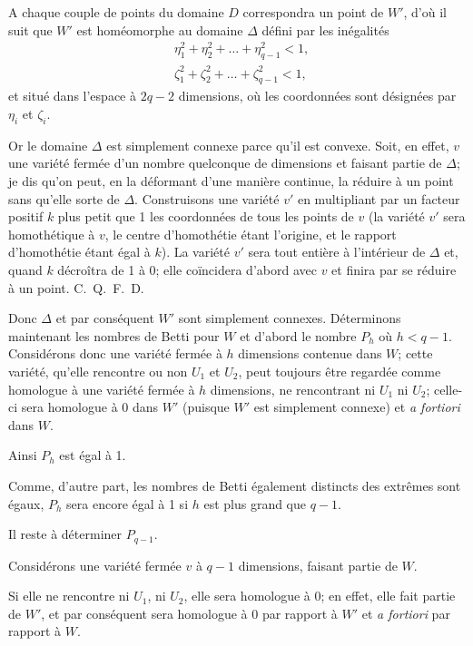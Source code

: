 \documentclass{article}
\begin{document}
A chaque couple de points du domaine $D$ correspondra un point de $W'$, d'où il suit que $W'$ est homéomorphe au domaine $\Delta$ défini par les inégalités
\[ \begin{aligned} &\eta^{2}_{1} + \eta^{2}_{2} + \ldots + \eta^{2}_{q-1} < 1,\\ &\zeta^{2}_{1} + \zeta^{2}_{2} + \ldots + \zeta^{2}_{q-1} < 1, \end{aligned} \]
et situé dans l'espace à $2q - 2$ dimensions, où les coordonnées sont désignées par $\eta_{i}$ et $\zeta_{i}$.

Or le domaine $\Delta$ est simplement connexe parce qu'il est convexe. Soit, en effet, $v$ une variété fermée d'un nombre quelconque de dimensions et faisant partie de $\Delta$; je dis qu'on peut, en la déformant d'une manière continue,
la réduire à un point sans qu'elle sorte de $\Delta$. Construisons une variété $v'$ en multipliant par un facteur positif $k$ plus petit que 1 les coordonnées de tous les points de $v$ (la variété $v'$ sera homothétique à $v$, le centre d'homothétie étant l'origine, et le rapport d'homothétie étant égal à $k$). La variété $v'$ sera tout entière à l'intérieur de $\Delta$ et, quand $k$ décroîtra de 1 à 0; elle coïncidera d'abord avec $v$ et finira par se réduire à un point. C.~Q.~F.~D.

Donc $\Delta$ et par conséquent $W'$ sont simplement connexes. Déterminons maintenant les nombres de Betti pour $W$ et d'abord le nombre $P_{h}$ où $h < q - 1$. Considérons donc une variété fermée à $h$ dimensions contenue dans $W$; cette variété, qu'elle rencontre ou non $U_{1}$ et $U_{2}$, peut toujours être regardée comme homologue à une variété fermée à $h$ dimensions, ne rencontrant ni $U_{1}$ ni $U_{2}$; celle-ci sera homologue à 0 dans $W'$ (puisque $W'$ est simplement connexe) et \emph{a fortiori} dans $W$.

Ainsi $P_{h}$ est égal à 1.

Comme, d'autre part, les nombres de Betti également distincts des extrêmes sont égaux, $P_{h}$ sera encore égal à 1 si $h$ est plus grand que $q - 1$.

Il reste à déterminer $P_{q-1}$.

Considérons une variété fermée $v$ à $q - 1$ dimensions, faisant partie de $W$.

Si elle ne rencontre ni $U_{1}$, ni $U_{2}$, elle sera homologue à 0; en effet, elle fait partie de $W'$, et par conséquent sera homologue à 0 par rapport à $W'$ et \emph{a fortiori} par rapport à $W$.
\end{document}
